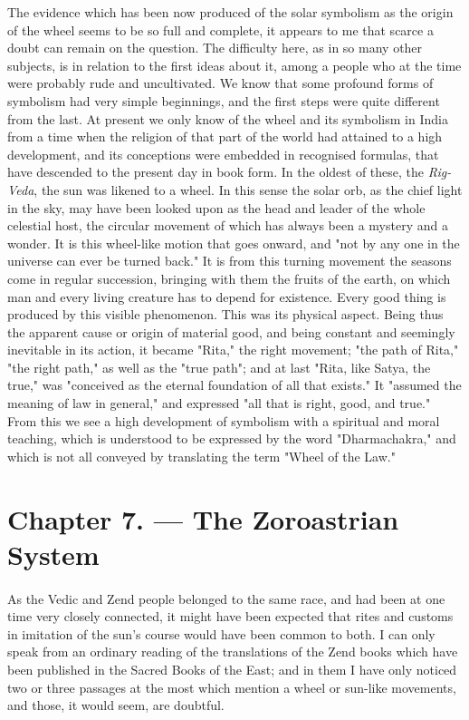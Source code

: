 \documentclass[a4paper, 11pt, oneside, polutonikogreek, english]{article}
\begin{document}
The evidence which has been now produced of the solar symbolism as the origin of the wheel seems to be so full and complete, it appears to me that scarce a doubt can remain on the question. The difficulty here, as in so many other subjects, is in relation to the first ideas about it, among a people who at the time were probably rude and uncultivated. We know that some profound forms of symbolism had very simple beginnings, and the first steps were quite different from the last. At present we only know of the wheel and its symbolism in India from a time when the religion of that part of the world had attained to a high development, and its conceptions were embedded in recognised formulas, that have descended to the present day in book form. In the oldest of these, the \emph{Rig-Veda}, the sun was likened to a wheel. In this sense the solar orb, as the chief light in the sky, may have been looked upon as the head and leader of the whole celestial host, the circular movement of which has always been a mystery and a wonder. It is this wheel-like motion that goes onward, and "not by any one in the universe can ever be turned back." It is from this turning movement the seasons come in regular succession, bringing with them the fruits of the earth, on which man and every living creature has to depend for existence. Every good thing is produced by this visible phenomenon. This was its physical aspect. Being thus the apparent cause or origin of material good, and being constant and seemingly inevitable in its action, it became "Rita," the right movement; "the path of Rita," "the right path," as well as the "true path"; and at last "Rita, like Satya, the true," was "conceived as the eternal foundation of all that exists." It "assumed the meaning of law in general," and expressed "all that is right, good, and true." From this we see a high development of symbolism with a spiritual and moral teaching, which is understood to be expressed by the word "Dharmachakra," and which is not all conveyed by translating the term "Wheel of the Law."
\clearpage
\section{Chapter 7. --- The Zoroastrian System}
\paragraph{}
As the Vedic and Zend people belonged to the same race, and had been at one time very closely connected, it might have been expected that rites and customs in imitation of the sun's course would have been common to both. I can only speak from an ordinary reading of the translations of the Zend books which have been published in the Sacred Books of the East; and in them I have only noticed two or three passages at the most which mention a wheel or sun-like movements, and those, it would seem, are doubtful.
\end{document}
